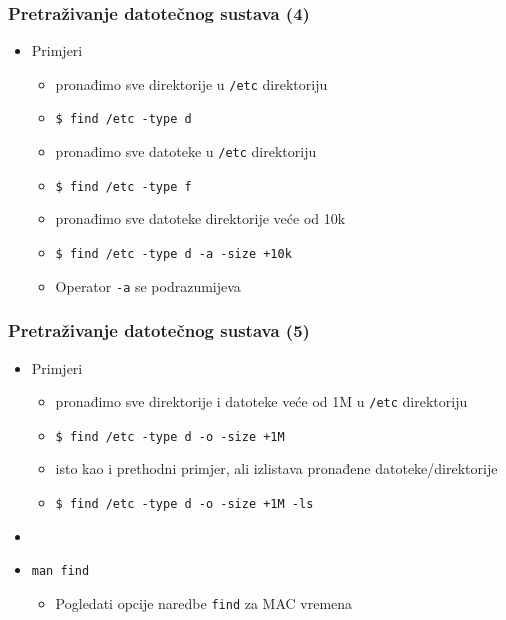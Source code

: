 \documentclass{beamer}
\newcommand{\shell}[1]{\texttt{#1}}
\begin{document}
\begin{frame}[t]
\frametitle{Pretraživanje datotečnog sustava (4)}
\begin{itemize}
  \item Primjeri
  \begin{itemize}
    \item pronađimo sve direktorije u \shell{/etc} direktoriju
    \item[] \shell{\$ find /etc -type d}
    \item pronađimo sve datoteke u \shell{/etc} direktoriju
    \item[] \shell{\$ find /etc -type f}
    \item pronađimo sve datoteke direktorije veće od 10k
    \item[] \shell{\$ find /etc -type d -a -size +10k}
    \item Operator \shell{-a} se podrazumijeva
  \end{itemize}
\end{itemize}
\end{frame}

\begin{frame}[t]
\frametitle{Pretraživanje datotečnog sustava (5)}
\begin{itemize}
  \item Primjeri
  \begin{itemize}
    \item pronađimo sve direktorije i datoteke veće od 1M u \shell{/etc} 
          direktoriju
    \item[] \shell{\$ find /etc -type d -o -size +1M}
    \item isto kao i prethodni primjer, ali izlistava pronađene 
          datoteke/direktorije
    \item[] \shell{\$ find /etc -type d -o -size +1M -ls}
  \end{itemize}
  \item[]
  \item[] \shell{man find}
  \begin{itemize}
    \item Pogledati opcije naredbe \shell{find} za MAC vremena
  \end{itemize}
\end{itemize}
\end{frame}
\end{document}
